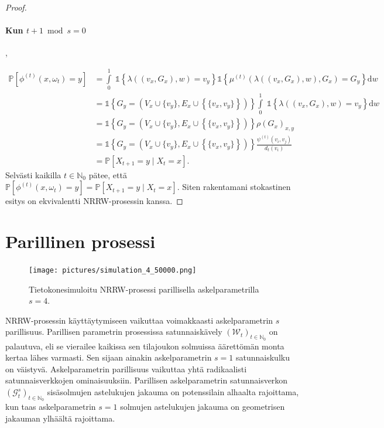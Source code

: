 \documentclass[finnish, 12pt, a4paper, sci, utf8, pdfa]{aaltothesis}
\newcommand{\N}{\mathbb{N}}
\newcommand{\Grandom}{\mathcal{G}}
\newcommand{\Wrandom}{\mathcal{W}}
\newcommand{\indicator}{\mathopen{\mathds{1}}}
\newcommand*{\prob}{\mathbb{P}}
\begin{document}
\begin{proof}
\paragraph{Kun $ t + 1 \bmod s = 0 $},

\begin{align*}
   \prob \left[ \phi^{(t)}(x, \omega_{t}) = y \right] &= \int\limits_0^1 \; \indicator \left\{ \lambda\left( (v_{x}, G_{x}), w \right) = v_{y} \right\} \indicator \left\{ \mu^{(t)} \left( \lambda\left( (v_{x}, G_{x}), w \right), G_{x} \right) = G_{y} \right\} \mathrm{d}w \\
                                                &= \indicator \left\{ G_{y} = (V_{x} \cup \{ v_{y} \}, E_{x} \cup \left\{ \{ v_{x}, v_{y} \} \right\}) \right\} \int\limits_0^1 \; \indicator \left\{ \lambda\left( (v_{x}, G_{x}), w \right) = v_{y} \right\}  \mathrm{d}w \\
                                                &= \indicator \left\{ G_{y} = (V_{x} \cup \{ v_{y} \}, E_{x} \cup \left\{ \{ v_{x}, v_{y} \} \right\}) \right\} \rho(G_{x})_{x,y} \\
                                                &= \indicator \left\{ G_{y} = (V_{x} \cup \{ v_{y} \}, E_{x} \cup \left\{ \{ v_{x}, v_{y} \} \right\}) \right\} \frac{\psi^{(t)}(v_{i}, v_{j})}{d_{t}(v_{i})} \\
                                                &= \prob \left[ X_{t+1} = y \mid X_{t} = x \right].
\end{align*}
Selvästi kaikilla $ t \in \N_{0} $ pätee, että $ \prob \left[ \phi^{(t)}(x, \omega_{t}) = y \right] = \prob \left[ X_{t+1} = y \mid X_{t} = x \right] $. Siten rakentamani stokastinen esitys on ekvivalentti NRRW-prosessin kanssa.

\end{proof}

\section{Parillinen prosessi}

\begin{figure}[htb]
\centering
\texttt{[image: pictures/simulation\_4\_50000.png]}
   \caption{Tietokonesimuloitu NRRW-prosessi parillisella askelparametrilla $ s = 4 $. \label{figure:oma_simulaatio}}
\end{figure}

NRRW-prosessin käyttäytymiseen vaikuttaa voimakkaasti askelparametrin $ s $ parillisuus. Parillisen parametrin prosessissa satunnaiskävely $ (\Wrandom_{t})_{t \in \N_{0}} $ on palautuva, eli se vierailee kaikissa sen tilajoukon solmuissa äärettömän monta kertaa lähes varmasti. Sen sijaan ainakin askelparametrin $ s = 1 $ satunnaiskulku on väistyvä. Askelparametrin parillisuus vaikuttaa yhtä radikaalisti satunnaisverkkojen ominaisuuksiin. Parillisen askelparametrin satunnaisverkon $ (\Grandom^{s}_{t})_{t \in \N_{0}} $ sisäsolmujen astelukujen jakauma on potenssilain alhaalta rajoittama, kun taas askelparametrin $ s = 1 $ solmujen astelukujen jakauma on geometrisen jakauman ylhäältä rajoittama.
\end{document}
